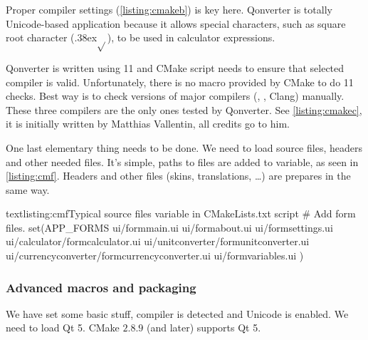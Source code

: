 Proper compiler settings (\autoref{listing:cmakeb}) is key here. Qonverter is totally Unicode-based application because it allows special characters, such as square root character ({\raise.38ex\hbox{$\sqrt{ }$}}), to be used in calculator expressions.


Qonverter is written using \cpp{} 11 and CMake script needs to ensure that selected compiler is valid. Unfortunately, there is no macro provided by CMake to do \cpp{} 11 checks. Best way is to check versions of major compilers (, , Clang) manually. These three compilers are the only ones tested by Qonverter. See \autoref{listing:cmakec}, it is initially written by Matthias Vallentin, all credits go to him.

One last elementary thing needs to be done. We need to load source files, headers and other needed files. It's simple, paths to files are added to variable, as seen in \autoref{listing:cmf}. Headers and other files (skins, translations, \ldots) are prepares in the same way.

\begin{fdoccode}{text}{listing:cmf}{Typical source files variable in CMakeLists.txt script}
# Add form files.
set(APP_FORMS
    ui/formmain.ui
    ui/formabout.ui
    ui/formsettings.ui
    ui/calculator/formcalculator.ui
    ui/unitconverter/formunitconverter.ui
    ui/currencyconverter/formcurrencyconverter.ui
    ui/formvariables.ui
)
\end{fdoccode}

\subsubsection{Advanced macros and packaging}
We have set some basic stuff, compiler is detected and Unicode is enabled. We need to load Qt 5. CMake $2.8.9$ (and later) supports Qt 5.

